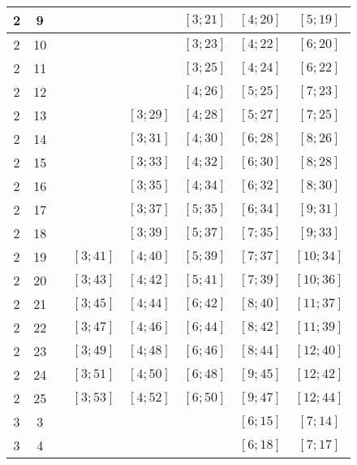 \documentclass[a4paper,12pt]{article}
\begin{document}
\begin{center}
{\begin{longtable}[H]{|c|c|c|c|c|c|c|c|}
2 &  9 &   &   &   &  $\left[ 3; 21\right]$ &  $\left[ 4; 20\right]$ &  $\left[ 5; 19\right]$ \tabularnewline \hline
2 &  10 &   &   &   &  $\left[ 3; 23\right]$ &  $\left[ 4; 22\right]$ &  $\left[ 6; 20\right]$ \tabularnewline \hline
2 &  11 &   &   &   &  $\left[ 3; 25\right]$ &  $\left[ 4; 24\right]$ &  $\left[ 6; 22\right]$ \tabularnewline \hline
2 &  12 &   &   &   &  $\left[ 4; 26\right]$ &  $\left[ 5; 25\right]$ &  $\left[ 7; 23\right]$ \tabularnewline \hline
2 &  13 &   &   &  $\left[ 3; 29\right]$ &  $\left[ 4; 28\right]$ &  $\left[ 5; 27\right]$ &  $\left[ 7; 25\right]$ \tabularnewline \hline
2 &  14 &   &   &  $\left[ 3; 31\right]$ &  $\left[ 4; 30\right]$ &  $\left[ 6; 28\right]$ &  $\left[ 8; 26\right]$ \tabularnewline \hline
2 &  15 &   &   &  $\left[ 3; 33\right]$ &  $\left[ 4; 32\right]$ &  $\left[ 6; 30\right]$ &  $\left[ 8; 28\right]$ \tabularnewline \hline
2 &  16 &   &   &  $\left[ 3; 35\right]$ &  $\left[ 4; 34\right]$ &  $\left[ 6; 32\right]$ &  $\left[ 8; 30\right]$ \tabularnewline \hline
2 &  17 &   &   &  $\left[ 3; 37\right]$ &  $\left[ 5; 35\right]$ &  $\left[ 6; 34\right]$ &  $\left[ 9; 31\right]$ \tabularnewline \hline
2 &  18 &   &   &  $\left[ 3; 39\right]$ &  $\left[ 5; 37\right]$ &  $\left[ 7; 35\right]$ &  $\left[ 9; 33\right]$ \tabularnewline \hline
2 &  19 &   &  $\left[ 3; 41\right]$ &  $\left[ 4; 40\right]$ &  $\left[ 5; 39\right]$ &  $\left[ 7; 37\right]$ &  $\left[ 10; 34\right]$ \tabularnewline \hline
2 &  20 &   &  $\left[ 3; 43\right]$ &  $\left[ 4; 42\right]$ &  $\left[ 5; 41\right]$ &  $\left[ 7; 39\right]$ &  $\left[ 10; 36\right]$ \tabularnewline \hline
2 &  21 &   &  $\left[ 3; 45\right]$ &  $\left[ 4; 44\right]$ &  $\left[ 6; 42\right]$ &  $\left[ 8; 40\right]$ &  $\left[ 11; 37\right]$ \tabularnewline \hline
2 &  22 &   &  $\left[ 3; 47\right]$ &  $\left[ 4; 46\right]$ &  $\left[ 6; 44\right]$ &  $\left[ 8; 42\right]$ &  $\left[ 11; 39\right]$ \tabularnewline \hline
2 &  23 &   &  $\left[ 3; 49\right]$ &  $\left[ 4; 48\right]$ &  $\left[ 6; 46\right]$ &  $\left[ 8; 44\right]$ &  $\left[ 12; 40\right]$ \tabularnewline \hline
2 &  24 &   &  $\left[ 3; 51\right]$ &  $\left[ 4; 50\right]$ &  $\left[ 6; 48\right]$ &  $\left[ 9; 45\right]$ &  $\left[ 12; 42\right]$ \tabularnewline \hline
2 &  25 &   &  $\left[ 3; 53\right]$ &  $\left[ 4; 52\right]$ &  $\left[ 6; 50\right]$ &  $\left[ 9; 47\right]$ &  $\left[ 12; 44\right]$ \tabularnewline \hline
3 &  3 &   &   &   &   &  $\left[ 6; 15\right]$ &  $\left[ 7; 14\right]$ \tabularnewline \hline
3 &  4 &   &   &   &   &  $\left[ 6; 18\right]$ &  $\left[ 7; 17\right]$ \tabularnewline \hline

\end{longtable}}
\end{center}
\end{document}

